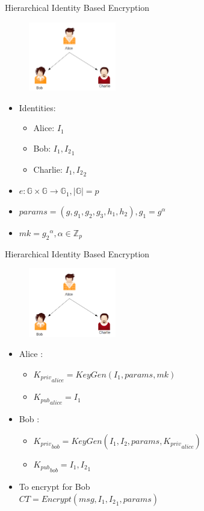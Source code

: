 \documentclass{beamer}
\begin{document}
\begin{frame}{Hierarchical Identity Based Encryption}
\begin{figure}
\includegraphics[height=3cm]{img/img3.png} 
\end{figure}
\pause \begin{itemize}
\item Identities:
 \begin{itemize}
	\item Alice: $I_1$
	\item Bob: $I_1,{I_2}_1$
	\item Charlie: $I_1,{I_2}_2$
\end{itemize}
\pause \item $e : \mathbb{G} \times \mathbb{G} \to \mathbb{G}_1 , |\mathbb{G}| = p$
\pause \item $params = (g, g_1, g_2, g_3, h_1, h_2) ,  g_1 = g^\alpha$
\pause \item $mk = {g_2}^\alpha , \alpha \in \mathbb{Z}_p$
\end{itemize}
\end{frame}

\begin{frame}{Hierarchical Identity Based Encryption}
\begin{figure}
\includegraphics[height=3cm]{img/img3.png} 
\end{figure}

\begin{itemize}
\item Alice :
\begin{itemize}
\item ${K_{priv}}_{alice} = KeyGen(I_1, params, mk)$ 
\item ${K_{pub}}_{alice} = I_1$
\end{itemize}

\item Bob :
\begin{itemize}
\item ${K_{priv}}_{bob} = KeyGen(I_1, I_2, params, {K_{priv}}_{alice})$
\item ${K_{pub}}_{bob} = I_1, {I_2}_1$
\end{itemize}

\item To encrypt for Bob \\ $CT = Encrypt(msg, I_1, {I_2}_1, params)$


\end{itemize}
\end{frame}
\end{document}

